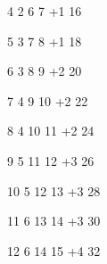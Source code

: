        4           2           6               7              +1                      16

       5           3           7               8              +1                      18

       6           3           8               9              +2                      20

       7           4           9               10             +2                      22

       8           4          10               11             +2                      24

       9           5          11               12             +3                      26

       10          5          12               13             +3                      28

       11          6          13               14             +3                      30

       12          6          14               15             +4                      32


